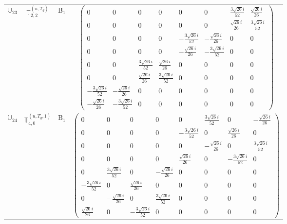 \documentclass[fleqn,10pt,landscape]{article}
\begin{document}
\begin{itemize}
\begin{center}
\begin{longtable}{c|c|c|c}
$ \mathbb{U}_{23} $ & $\mathbb{T}_{2,2}^{(u,T_{g})}$ & B$_{1}$ & $\begin{pmatrix} 0 & 0 & 0 & 0 & 0 & 0 & \frac{3 \sqrt{26} i}{52} & \frac{\sqrt{26} i}{26} \\ 0 & 0 & 0 & 0 & 0 & 0 & \frac{\sqrt{26} i}{26} & \frac{3 \sqrt{26} i}{52} \\ 0 & 0 & 0 & 0 & - \frac{3 \sqrt{26} i}{52} & - \frac{\sqrt{26} i}{26} & 0 & 0 \\ 0 & 0 & 0 & 0 & - \frac{\sqrt{26} i}{26} & - \frac{3 \sqrt{26} i}{52} & 0 & 0 \\ 0 & 0 & \frac{3 \sqrt{26} i}{52} & \frac{\sqrt{26} i}{26} & 0 & 0 & 0 & 0 \\ 0 & 0 & \frac{\sqrt{26} i}{26} & \frac{3 \sqrt{26} i}{52} & 0 & 0 & 0 & 0 \\ - \frac{3 \sqrt{26} i}{52} & - \frac{\sqrt{26} i}{26} & 0 & 0 & 0 & 0 & 0 & 0 \\ - \frac{\sqrt{26} i}{26} & - \frac{3 \sqrt{26} i}{52} & 0 & 0 & 0 & 0 & 0 & 0 \end{pmatrix}$ \\
$ \mathbb{U}_{24} $ & $\mathbb{T}_{4,0}^{(u,T_{g},1)}$ & B$_{1}$ & $\begin{pmatrix} 0 & 0 & 0 & 0 & 0 & \frac{3 \sqrt{26} i}{52} & 0 & - \frac{\sqrt{26} i}{26} \\ 0 & 0 & 0 & 0 & - \frac{3 \sqrt{26} i}{52} & 0 & \frac{\sqrt{26} i}{26} & 0 \\ 0 & 0 & 0 & 0 & 0 & - \frac{\sqrt{26} i}{26} & 0 & \frac{3 \sqrt{26} i}{52} \\ 0 & 0 & 0 & 0 & \frac{\sqrt{26} i}{26} & 0 & - \frac{3 \sqrt{26} i}{52} & 0 \\ 0 & \frac{3 \sqrt{26} i}{52} & 0 & - \frac{\sqrt{26} i}{26} & 0 & 0 & 0 & 0 \\ - \frac{3 \sqrt{26} i}{52} & 0 & \frac{\sqrt{26} i}{26} & 0 & 0 & 0 & 0 & 0 \\ 0 & - \frac{\sqrt{26} i}{26} & 0 & \frac{3 \sqrt{26} i}{52} & 0 & 0 & 0 & 0 \\ \frac{\sqrt{26} i}{26} & 0 & - \frac{3 \sqrt{26} i}{52} & 0 & 0 & 0 & 0 & 0 \end{pmatrix}$ \\

\end{longtable}
\end{center}
\end{itemize}
\end{document}
